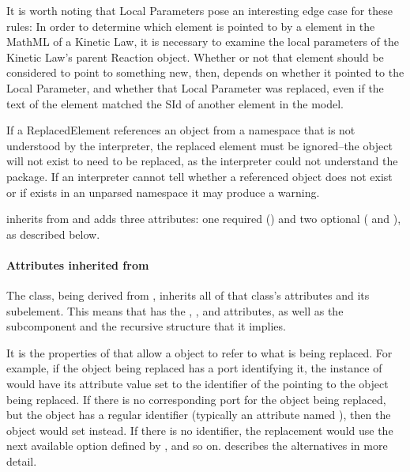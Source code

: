 It is worth noting that Local Parameters pose an interesting edge case 
for these rules: In order to determine which element is pointed to by a 
 element in the MathML of a Kinetic Law, it is necessary to examine 
the local parameters of the Kinetic Law's parent Reaction object. 
Whether or not that  element should be considered to point to 
something new, then, depends on whether it pointed to the Local 
Parameter, and whether that Local Parameter was replaced, even if the 
text of the element matched the SId of another element in the model. 

If a ReplacedElement references an object from a namespace that is not
understood by the interpreter, the replaced element must be ignored--the 
object will not exist to need to be replaced, as the interpreter could not
understand the package.  If an interpreter cannot tell whether 
a referenced object does not exist or if exists in an unparsed namespace
it may produce a warning.

\ReplacedElement inherits from \SBaseRef and adds three attributes: one
required () and two optional ( and
), as described below.


\paragraph{Attributes inherited from }

The \ReplacedElement class, being derived from \SBaseRef, inherits all
of that class's attributes and its subelement.  This means that
\ReplacedElement has the , , 
and  attributes, as well as the subcomponent
 and the recursive structure that it implies.

It is the properties of \SBaseRef that allow a \ReplacedElement object
to refer to what is being replaced.  For example, if the object being
replaced has a port identifying it, the instance of \ReplacedElement
would have its  attribute value set to the identifier of
the \Port pointing to the object being replaced.  If there is no
corresponding port for the object being replaced, but the object has a
regular identifier (typically an attribute named ), then the
\ReplacedElement object would set  instead.  If there is no
identifier, the replacement would use the next available option defined
by \SBaseRef, and so on.   describes the
alternatives in more detail.


